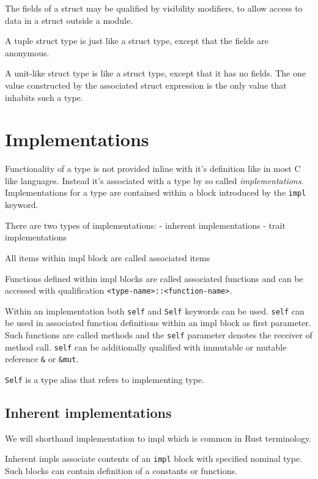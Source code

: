 The fields of a struct may be qualified by visibility modifiers, to allow access to data in a struct outside a module.

A tuple struct type is just like a struct type, except that the fields are anonymous.

A unit-like struct type is like a struct type, except that it has no fields. The one value constructed by the associated struct expression is the only value that inhabits such a type.

\section{Implementations}

Functionality of a type is not provided inline with it's definition like in most C like languages. 
Instead it's associated with a type by so called \textit{implementations}.
Implementations for a type are contained within a block introduced by the \texttt{impl} keyword.

There are two types of implementations:
- inherent implementations
- trait implementations

All items within impl block are called associated items

Functions defined within impl blocks are called associated functions and can be accessed with qualification \texttt{<type-name>::<function-name>}.

Within an implementation both \texttt{self} and \texttt{Self} keywords can be used.
\texttt{self} can be used in associated function definitions within an impl block as first parameter. 
Such functions are called methods and the \texttt{self} parameter denotes the receiver of method call. 
\texttt{self} can be additionally qualified with immutable or mutable reference \texttt{\&} or \texttt{\&mut}.

\texttt{Self} is a type alias that refers to implementing type.


\subsection{Inherent implementations}

We will shorthand implementation to impl which is common in Rust terminology.

Inherent impls associate contents of an \texttt{impl} block with specified nominal type.
Such blocks can contain definition of a constants or functions. 

